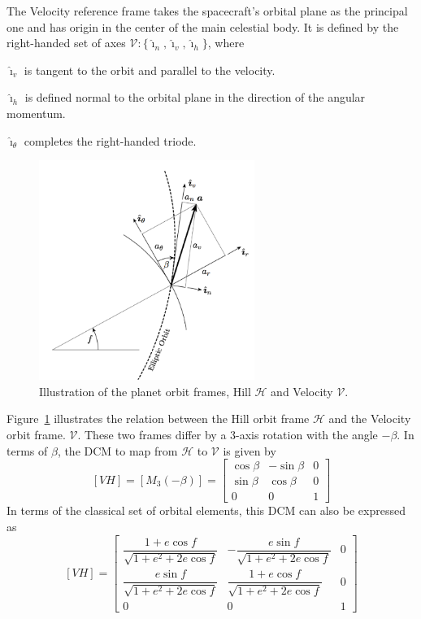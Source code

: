\documentclass[]{AVSSimReportMemo}
\begin{document}
The Velocity reference frame takes the spacecraft's orbital plane as the principal one and has origin in the center of the main celestial body. It is defined by the right-handed set of axes $\mathcal{V}:\{ \hat{\bm\imath}_{n}, \hat{\bm\imath}_{v}, \hat{\bm\imath}_{h} \}$, where\par
$\hat {\bm\imath}_{v}$  is tangent to the orbit and parallel to the velocity. \par
$\hat {\bm\imath}_{h}$ is defined normal to the orbital plane in the direction of the angular momentum. \par
$\hat {\bm\imath}_{\theta}$ completes the right-handed triode.\par
\begin{figure}[htb]
  \centerline{
  \includegraphics[width=7cm]{Figures/Fig2}
  }
  \caption{Illustration of the planet orbit frames, Hill $\mathcal{H}$ and Velocity $\mathcal{V}$.}
  \label{fig:Fig1}
\end{figure}
Figure~\ref{fig:Fig1} illustrates the relation between the Hill orbit frame $\mathcal{H}$ and the Velocity orbit frame.  $\mathcal{V}$. These two frames differ by a 3-axis rotation with the angle $-\beta$.  In terms of $\beta$, the DCM to map from $\mathcal{H}$ to $\mathcal{V}$ is given by
\begin{equation}
  \label{eq:VH1}
  [VH] = [M_{3}(-\beta)] = \begin{bmatrix}
    \cos\beta & -\sin\beta & 0 \\
    \sin\beta & \cos\beta &0 \\
    0 & 0 & 1
  \end{bmatrix}
\end{equation}
In terms of the classical set of orbital elements, this DCM can also be expressed as
\begin{equation}
  \label{eq:VH2}
  [VH] = \begin{bmatrix}
    \dfrac{1 + e \cos f}{\sqrt{1+e^{2}+2e \cos f}} & 
    -\dfrac{e \sin f}{\sqrt{1+e^{2}+2e \cos f} }
    & 0 \\
    \dfrac{e \sin f}{\sqrt{1+e^{2}+2e \cos f}}  & \dfrac{1 + e \cos f}{\sqrt{1+e^{2}+2e \cos f}} & 0\\
    0 & 0 & 1
  \end{bmatrix}
\end{equation}
\end{document}
